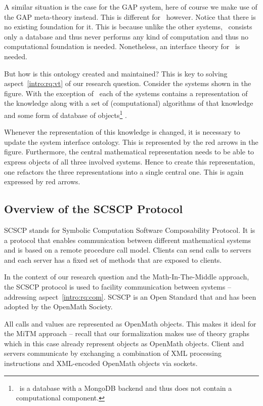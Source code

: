 \begin{description}
    A similar situation is the case for the GAP system, here of course we make use of the GAP meta-theory instead. 
    This is different for \lmfdb\ however. 
    Notice that there is no existing foundation for it. 
    This is because unlike the other systems, \lmfdb\ consists only a database and thus never performs any kind of computation and thus no computational foundation is needed. 
    Nonetheless, an interface theory for \lmfdb\ is needed. 
    
\end{description}

But how is this ontology created and maintained?
This is key to solving aspect~\ref{intro:rq:vt} of our research question. 
Consider the systems shown in the figure. 
With the exception of \lmfdb\ each of the systems contains a representation of the knowledge along with a set of (computational) algorithms of that knowledge and some form of database of objects\footnote{\lmfdb\ is a database with a MongoDB backend and thus does not contain a computational component. } . 

Whenever the representation of this knowledge is changed, it is necessary to update the system interface ontology. 
This is represented by the red arrows in the figure. 
Furthermore, the central mathematical representation needs to be able to express objects of all three involved systems. 
Hence to create this representation, one refactors the three representations into a single central one. 
This is again expressed by red arrows. 

\subsection{Overview of the SCSCP Protocol}\label{sec:mitm:scscp}

SCSCP \cite{SCSCP} stands for Symbolic Computation Software Composability Protocol. 
It is a protocol that enables communication between different mathematical systems and is based on a remote procedure call model. 
Clients can send calls to servers and each server has a fixed set of methods that are exposed to clients. 

In the context of our research question and the Math-In-The-Middle approach, the SCSCP protocol is used to facility communication between systems -- addressing aspect~\ref{intro:rq:com}. 
SCSCP is an Open Standard that and has been adopted by the OpenMath Society. 

All calls and values are represented as OpenMath objects. 
This makes it ideal for the MiTM approach -- recall that our formalization makes use of theory graphs which in this case already represent objects as OpenMath objects. 
Client and servers communicate by exchanging a combination of XML processing instructions and XML-encoded OpenMath objects via sockets. 

